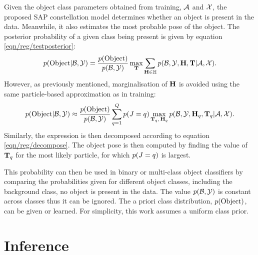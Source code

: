 Given the object class parameters obtained from training, $\mathcal{A}$ and $\mathcal{X}$, the proposed SAP constellation model determines whether an object is present in the data. Meanwhile, it also estimates the most probable pose of the object. 
The posterior probability of a given class being present is given by equation \ref{eqn/reg/testposterior}: 
\begin{equation}
	p(\mathrm{Object}|\mathcal{B},\mathcal{Y}) = \displaystyle\frac{p(\mathrm{Object})}{p(\mathcal{B},\mathcal{Y})}\max_{\mathbf{T}}\sum_{\mathbf{H} \in \mathbb{H}}p(\mathcal{B},\mathcal{Y},\mathbf{H},\mathbf{T}|\mathcal{A},\mathcal{X}).
	\label{eqn/reg/testposterior}
\end{equation}
However, as previously mentioned, marginalisation of $\mathbf{H}$ is avoided using the same particle-based approximation as in training:
\begin{equation}
	p(\mathrm{Object}|\mathcal{B},\mathcal{Y}) \approx \displaystyle\frac{p(\mathrm{Object})}{p(\mathcal{B},\mathcal{Y})} \sum_{q=1}^Q p({J} = q)
	\max_{\mathbf{T}_q,\,\mathbf{H}_q} p(\mathcal{B},\mathcal{Y},\mathbf{H}_q,\mathbf{T}_q|\mathcal{A},\mathcal{X}).
	\label{eqn/reg/testobjective}
\end{equation}
Similarly, the expression is then decomposed according to equation \ref{eqn/reg/decompose}.
The object pose is then computed by finding the value of $\mathbf{T}_q$ for the most likely particle, \ie for which $p({J} = q)$ is largest.

This probability can then be used in binary or multi-class object classifiers by comparing the probabilities given for different object classes, including the background class, \ie no object is present in the data. The value $p(\mathcal{B},\mathcal{Y})$ is constant across classes thus it can be ignored. The a priori class distribution, $p(\mathrm{Object})$, can be given or learned. For simplicity, this work assumes a uniform class prior. 

\section{Inference}
\label{sec/reg/optimisation}

